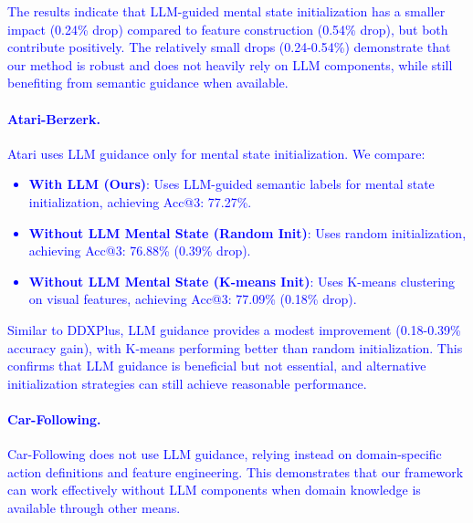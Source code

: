 \documentclass{article} %
\newcommand{\revise}[1]{\textcolor{blue}{#1}}
\begin{document}
\revise{The results indicate that LLM-guided mental state initialization has a smaller impact (0.24\% drop) compared to feature construction (0.54\% drop), but both contribute positively. The relatively small drops (0.24-0.54\%) demonstrate that our method is robust and does not heavily rely on LLM components, while still benefiting from semantic guidance when available.}
\revise{\paragraph{Atari-Berzerk.}
Atari uses LLM guidance only for mental state initialization. We compare:
\begin{itemize}
    \item \textbf{With LLM (Ours)}: Uses LLM-guided semantic labels for mental state initialization, achieving Acc@3: 77.27\%.
    \item \textbf{Without LLM Mental State (Random Init)}: Uses random initialization, achieving Acc@3: 76.88\% (0.39\% drop).
    \item \textbf{Without LLM Mental State (K-means Init)}: Uses K-means clustering on visual features, achieving Acc@3: 77.09\% (0.18\% drop).
\end{itemize}}
\revise{Similar to DDXPlus, LLM guidance provides a modest improvement (0.18-0.39\% accuracy gain), with K-means performing better than random initialization. This confirms that LLM guidance is beneficial but not essential, and alternative initialization strategies can still achieve reasonable performance.}
\revise{\paragraph{Car-Following.}
Car-Following does not use LLM guidance, relying instead on domain-specific action definitions and feature engineering. This demonstrates that our framework can work effectively without LLM components when domain knowledge is available through other means.}
\end{document}

